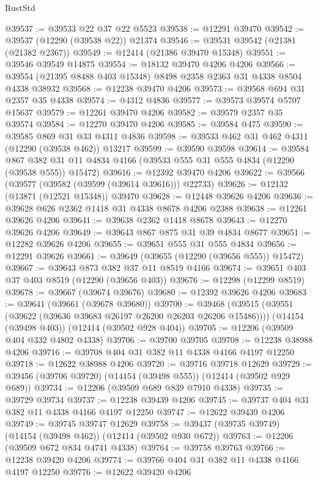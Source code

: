 \begin{lexlean}{RustStd}
\begin{coremodule}
@39537 := @39533 @22 @37 @22 @5523
@39538 := @12291 @39470
@39542 := @39537 (@12290 (@39538 @22)) @21374
@39546 := @39531 @39542 (@21381 (@21382 @2367))
@39549 := @12414 (@21386 @39470 @15348)
@39551 := @39546 @39549 @14875
@39554 := @18132 @39470 @4206 @4206
@39566 := @39554 (@21395 @8488 @403 @15348) @8498 @2358 @2363 @31 @4338 @8504 @4338 @38932
@39568 := @12238 @39470 @4206
@39573 := @39568 @694 @31 @2357 @35 @4338
@39574 := @4312 @4836
@39577 := @39573 @39574 @5707 @15637
@39579 := @12261 @39470 @4206
@39582 := @39579 @2357 @35 @39574
@39584 := @12270 @39470 @4206
@39585 := @39584 @475
@39590 := @39585 @869 @31 @33 @4311 @4836
@39598 := @39533 @462 @31 @462 @4311 (@12290 (@39538 @462)) @13217
@39599 := @39590 @39598
@39614 := @39584
    @867
    @382
    @31
    @11
    @4834
    @4166
    (@39533 @555 @31 @555 @4834 (@12290 (@39538 @555)) @15472)
@39616 := @12392 @39470 @4206
@39622 := @39566 (@39577 (@39582 (@39599 (@39614 @39616))) @22733)
@39626 := @12132 (@13871 (@12521 @15348)) @39470
@39628 := @12448 @39626 @4206
@39636 := @39628 @626 @2362 @1418 @31 @4338 @8678 @4206 @2388
@39638 := @12261 @39626 @4206
@39641 := @39638 @2362 @1418 @8678
@39643 := @12270 @39626 @4206
@39649 := @39643 @867 @875 @31 @39 @4834 @8677
@39651 := @12282 @39626 @4206
@39655 := @39651 @555 @31 @555 @4834
@39656 := @12291 @39626
@39661 := @39649 (@39655 (@12290 (@39656 @555)) @15472)
@39667 := @39643 @873 @382 @37 @11 @8519 @4166
@39674 := @39651 @403 @37 @403 @8519 (@12290 (@39656 @403))
@39676 := @12298 (@12299 @8519)
@39678 := @39667 (@39674 @39676)
@39680 := @12392 @39626 @4206
@39683 := @39641 (@39661 (@39678 @39680))
@39700 := @39468
    (@39515 (@39551 (@39622 (@39636 @39683 @26197 @26200 @26203 @26206 @15486))))
    (@14154 (@39498 @403))
    (@12414 (@39502 @928 @404))
@39705 := @12206 (@39509 @404 @332 @4802 @4338)
@39706 := @39700 @39705
@39708 := @12238 @38988 @4206
@39716 := @39708 @404 @31 @382 @11 @4338 @4166 @4197 @12250
@39718 := @12622 @38988 @4206
@39720 := @39716 @39718 @12629
@39729 := @39456 (@39706 @39720) (@14154 (@39498 @555)) (@12414 (@39502 @929 @689))
@39734 := @12206 (@39509 @689 @839 @7910 @4338)
@39735 := @39729 @39734
@39737 := @12238 @39439 @4206
@39745 := @39737 @404 @31 @382 @11 @4338 @4166 @4197 @12250
@39747 := @12622 @39439 @4206
@39749 := @39745 @39747 @12629
@39758 := @39437 (@39735 @39749) (@14154 (@39498 @462)) (@12414 (@39502 @930 @672))
@39763 := @12206 (@39509 @672 @834 @4741 @4338)
@39764 := @39758 @39763
@39766 := @12238 @39420 @4206
@39774 := @39766 @404 @31 @382 @11 @4338 @4166 @4197 @12250
@39776 := @12622 @39420 @4206

\end{coremodule}
\end{lexlean}
